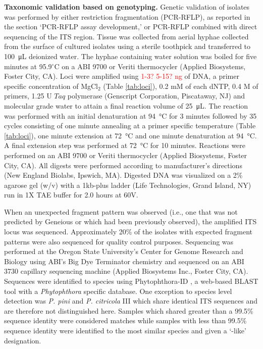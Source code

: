 \documentclass[12pt]{article}
\begin{document}
\textbf{Taxonomic validation based on genotyping.} Genetic validation of isolates was performed by either restriction fragmentation (PCR-RFLP), as reported in the section `PCR-RFLP assay development,' or PCR-RFLP combined with direct sequencing of the ITS region.  Tissue was collected from aerial hyphae collected from the surface of cultured isolates using a sterile toothpick and transferred to \SI{100}{\micro\liter} deionized water.  The hyphae containing water solution was boiled for five minutes at 95.9$^\circ$C on a ABI 9700 or Veriti thermocycler (Applied Biosystems, Foster City, CA).  Loci were amplified using \textcolor{red}{1-3? 5-15? ng} of DNA, a primer specific concentration of MgCl$_{2}$ (Table \ref{tab:loci}), 0.2 mM of each dNTP, 0.4 \textmu M of primers, 1.25 U $Taq$ polymerase (Genscript Corporation, Piscataway, NJ) and molecular grade water to attain a final reaction volume of \SI{25}{\micro\liter}.  The reaction was performed with an initial denaturation at \SI{94}{\celsius} for 3 minutes followed by 35 cycles consisting of one minute annealing at a primer specific temperature (Table \ref{tab:loci}), one minute extension at \SI{72}{\celsius} and one minute denaturation at \SI{94}{\celsius}.  A final extension step was performed at \SI{72}{\celsius} for 10 minutes.  Reactions were performed on an ABI 9700 or Veriti thermocycler (Applied Biosystems, Foster City, CA).  All digests were performed according to manufacturer's directions (New England Biolabs, Ipswich, MA).  Digested DNA was visualized on a 2\% agarose gel (w/v) with a 1kb-plus ladder (Life Technologies, Grand Island, NY) run in 1X TAE buffer for 2.0 hours at 60V.

When an unexpected fragment pattern was observed (i.e., one that was not predicted by Geneious or which had been previously observed), the amplified ITS locus was sequenced.  Approximately 20\% of the isolates with expected fragment patterns were also sequenced for quality control purposes.  Sequencing was performed at the Oregon State University's Center for Genome Research and Biology using ABI's Big Dye Terminator chemistry and sequenced on an ABI 3730 capillary sequencing machine (Applied Biosystems Inc., Foster City, CA).  Sequences were identified to species using Phytophthora-ID \cite{grunwald_etal_2011}, a web-based BLAST \cite{altschul_etal_1990} tool with a \emph{Phytophthora} specific database.  One exception to species level detection was \emph{P. pini} and \emph{P. citricola} III which share identical ITS sequences\cite{hong2011} and are therefore not distinguished here.  Samples which shared greater than a 99.5\% sequence identity were considered matches while samples with less than 99.5\% sequence identity were identified to the most similar species and given a `-like' designation.
\end{document}
